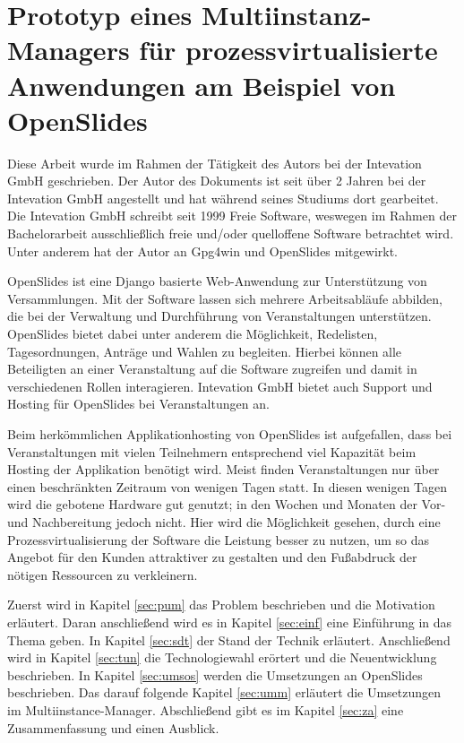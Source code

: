 \documentclass[11pt,a4paper]{article}
\newcommand{\printtitle}{Prototyp eines Multiinstanz-Managers für 
prozessvirtualisierte Anwendungen am Beispiel von OpenSlides}
\begin{document}
\section*{\printtitle}
Diese Arbeit wurde im Rahmen der Tätigkeit des Autors bei der Intevation 
GmbH\cite{inte} geschrieben. Der Autor des Dokuments ist seit über 2 Jahren bei
der Intevation GmbH angestellt und hat während seines Studiums dort gearbeitet. 
Die Intevation GmbH schreibt seit 1999 Freie Software, weswegen im Rahmen der 
Bachelorarbeit ausschließlich freie und/oder quelloffene Software betrachtet 
wird. Unter anderem hat der Autor an Gpg4win\cite{gpg4win} und 
OpenSlides\cite{oshp} mitgewirkt.

OpenSlides ist eine Django\cite{djangohp} basierte Web-Anwendung zur 
Unterstützung von Versammlungen. Mit der Software lassen sich mehrere 
Arbeitsabläufe abbilden, die bei der Verwaltung und Durchführung von 
Veranstaltungen unterstützen. OpenSlides bietet dabei unter anderem die 
Möglichkeit, Redelisten, Tagesordnungen, Anträge und Wahlen zu begleiten. 
Hierbei können alle Beteiligten an einer Veranstaltung auf die Software 
zugreifen und damit in verschiedenen Rollen interagieren\cite{oshp}. Intevation 
GmbH bietet auch Support und Hosting für OpenSlides bei Veranstaltungen 
an\cite{oscom}.

Beim herkömmlichen Applikationhosting von OpenSlides ist aufgefallen, dass bei 
Veranstaltungen mit vielen Teilnehmern entsprechend viel Kapazität beim 
Hosting der Applikation benötigt wird. Meist finden Veranstaltungen nur über 
einen beschränkten Zeitraum von wenigen Tagen statt. In diesen wenigen Tagen 
wird die gebotene Hardware gut genutzt; in den Wochen und Monaten der Vor- und 
Nachbereitung jedoch nicht. Hier wird die Möglichkeit gesehen, durch eine 
Prozessvirtualisierung der Software die Leistung besser zu nutzen, um so das 
Angebot für den Kunden attraktiver zu gestalten und den Fußabdruck der nötigen 
Ressourcen zu verkleinern.

Zuerst wird in Kapitel \ref{sec:pum} das Problem beschrieben und die Motivation 
erläutert. Daran anschließend wird es in Kapitel \ref{sec:einf} eine Einführung 
in das Thema geben. In Kapitel \ref{sec:sdt} der Stand der Technik 
erläutert. Anschließend wird in Kapitel \ref{sec:tun} die Technologiewahl 
erörtert und die Neuentwicklung beschrieben. In Kapitel \ref{sec:umsos} werden 
die Umsetzungen an OpenSlides beschrieben. Das darauf folgende Kapitel 
\ref{sec:umm} erläutert die Umsetzungen im Multiinstance-Manager. Abschließend 
gibt es im Kapitel \ref{sec:za} eine Zusammenfassung und einen Ausblick.
\clearpage
\end{document}
